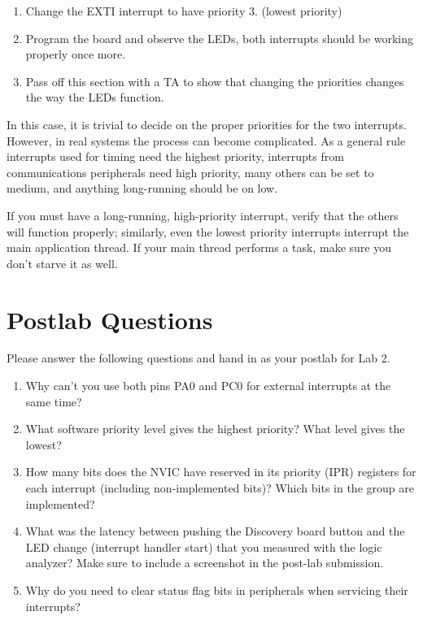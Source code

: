 \documentclass[11pt,fleqn]{book} %
\begin{document}
\begin{assignment}
    \begin{enumerate}
        \item Change the EXTI interrupt to have priority 3. (lowest priority)
        \item Program the board and observe the LEDs, both interrupts should be working properly once more.
        \item Pass off this section with a TA to show that changing the priorities changes the way the LEDs function.
    \end{enumerate}
    
    In this case, it is trivial to decide on the proper priorities for the two interrupts. However, in real systems the process can become complicated. As a general rule interrupts used for timing need the highest priority, interrupts from communications peripherals need high priority, many others can be set to medium, and anything long-running should be on low. 
    
    If you must have a long-running, high-priority interrupt, verify that the others will function properly; similarly, even the lowest priority interrupts interrupt the main application thread. If your main thread performs a task, make sure you don't starve it as well.
    
\end{assignment}

\section{\color{blue}Postlab Questions}
\begin{question}[Postlab 2]
	Please answer the following questions and hand in as your postlab for Lab 2.
	\begin{enumerate}
		\item Why can't you use both pins PA0 and PC0 for external interrupts at the same time?
		\item What software priority level gives the highest priority? What level gives the lowest?
		\item How many bits does the NVIC have reserved in its priority (IPR) registers for each interrupt (including non-implemented bits)?
		Which bits in the group are implemented?
		\item What was the latency between pushing the Discovery board button and the LED change (interrupt handler start) that you measured with the logic analyzer?
		Make sure to include a screenshot in the post-lab submission.
		\item Why do you need to clear status flag bits in peripherals when servicing their interrupts?
	\end{enumerate}
\end{question}
\end{document}
